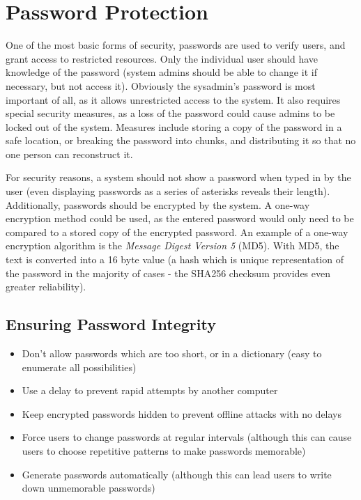 \documentclass[a4paper,oneside]{report}
\begin{document}
	\section{Password Protection} 
	
	One of the most basic forms of security, passwords are used to verify users, and grant access to restricted resources. Only the individual user should have knowledge of the password (system admins should be able to change it if necessary, but not access it). Obviously the sysadmin's password is most important of all, as it allows unrestricted access to the system. It also requires special security measures, as a loss of the password could cause admins to be locked out of the system. Measures include storing a copy of the password in a safe location, or breaking the password into chunks, and distributing it so that no one person can reconstruct it. 
	
	For security reasons, a system should not show a password when typed in by the user (even displaying passwords as a series of asterisks reveals their length). Additionally, passwords should be encrypted by the system. A one-way encryption method could be used, as the entered password would only need to be compared to a stored copy of the encrypted password. An example of a one-way encryption algorithm is the \emph{Message Digest Version 5} (MD5). With MD5, the text is converted into a 16 byte value (a hash which is unique representation of the password in the majority of cases - the SHA256 checksum provides even greater reliability).
	
	\subsection{Ensuring Password Integrity}
	
	\begin{itemize}
		\item Don't allow passwords which are too short, or in a dictionary (easy to enumerate all possibilities)
		\item Use a delay to prevent rapid attempts by another computer
		\item Keep encrypted passwords hidden to prevent offline attacks with no delays
		\item Force users to change passwords at regular intervals (although this can cause users to choose repetitive patterns to make passwords memorable)
		\item Generate passwords automatically (although this can lead users to write down unmemorable passwords)
	\end{itemize}
\end{document}
